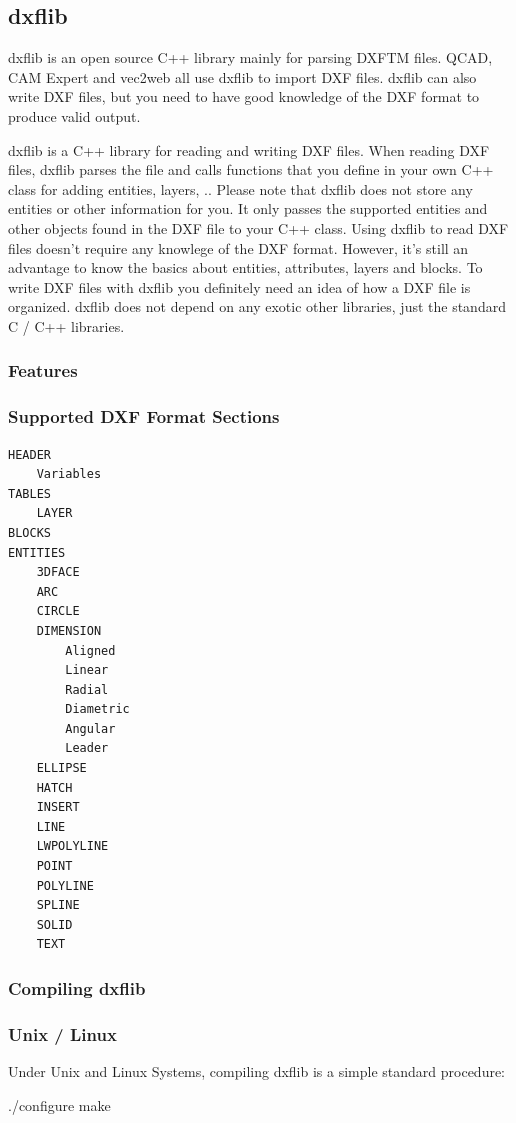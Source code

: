 \subsection{dxflib}
dxflib is an open source C++ library mainly for parsing DXFTM files. QCAD, CAM Expert and vec2web all use dxflib to import DXF files. dxflib can also write DXF files, but you need to have good knowledge of the DXF format to produce valid output.

dxflib is a C++ library for reading and writing DXF files. When reading DXF files, dxflib parses the file and calls functions that you define in your own C++ class for adding entities, layers, ..
Please note that dxflib does not store any entities or other information for you. It only passes the supported entities and other objects found in the DXF file to your C++ class.
Using dxflib to read DXF files doesn't require any knowlege of the DXF format. However, it's still an advantage to know the basics about entities, attributes, layers and blocks. To write DXF files with dxflib you definitely need an idea of how a DXF file is organized.
dxflib does not depend on any exotic other libraries, just the standard C / C++ libraries.

\subsubsection{Features}
\subsubsection*{Supported DXF Format Sections}
\begin{lstlisting}
HEADER
	Variables
TABLES
	LAYER
BLOCKS
ENTITIES
	3DFACE
	ARC
	CIRCLE
	DIMENSION
		Aligned
		Linear
		Radial
		Diametric
		Angular
		Leader
	ELLIPSE
	HATCH
	INSERT
	LINE
	LWPOLYLINE
	POINT
	POLYLINE
	SPLINE
	SOLID
	TEXT
\end{lstlisting}

\subsubsection{Compiling dxflib}
\subsubsection*{Unix / Linux}

Under Unix and Linux Systems, compiling dxflib is a simple standard procedure:

\begin{verbatim*}
./configure
make
\end{verbatim*}

